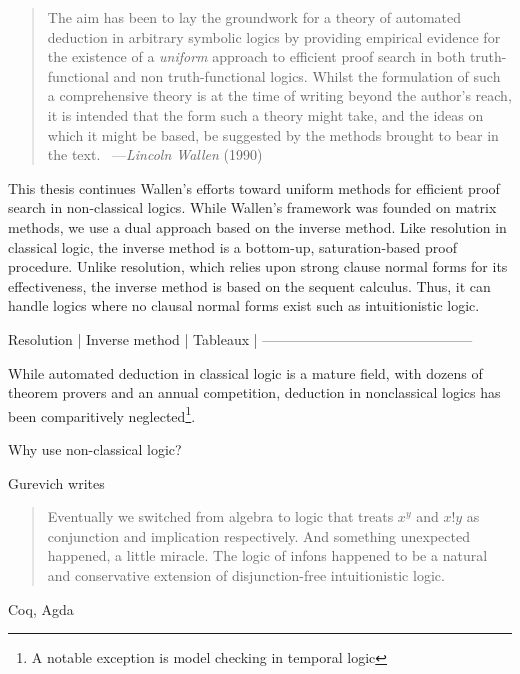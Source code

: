 
\begin{quote}
The aim has been to lay the groundwork for a theory of automated deduction in
arbitrary symbolic logics by providing empirical evidence for the existence of
a \emph{uniform} approach to efficient proof search in both truth-functional and
non truth-functional logics.  Whilst the formulation of such a comprehensive
theory is at the time of writing beyond the author's reach, it is intended that
the form such a theory might take, and the ideas on which it might be based, be
suggested by the methods brought to bear in the text.~\cite{Wallen.1990.Book}
---\textit{Lincoln Wallen} (1990)
\end{quote}

\vspace{1cm}

This thesis continues Wallen's efforts toward uniform methods for
efficient proof search in non-classical logics.  While Wallen's framework
was founded on matrix methods, we use a dual approach based on the
inverse method.  Like resolution in classical
logic, the inverse method is a bottom-up, saturation-based proof procedure.
Unlike resolution, which relies upon strong clause normal forms for its
effectiveness, the inverse method is based on the sequent calculus.
Thus, it can handle logics where no clausal normal forms exist such as
intuitionistic logic.


Resolution  |  Inverse method |  Tableaux |
---------------------------------------------



 While automated deduction in
classical logic is a mature field, with dozens of theorem provers and an
annual competition, deduction in nonclassical logics has been
comparitively neglected\footnote{A notable exception is model checking in temporal
logic}.

Why use non-classical logic?

\cite{Garg.10.SSP}
\cite{Gurevich.08.DKAL}
\cite{Gurevich.11.TCL}

Gurevich writes
\begin{quote}
Eventually we switched from algebra to logic that treats $x ^ y$ and $x ! y$ as
conjunction and implication respectively. And something unexpected happened,
a little miracle. The logic of infons happened to be a natural and conservative
extension of disjunction-free intuitionistic logic.~\citep{Gurevich.09.DKAL2}
\end{quote}


Coq, Agda

